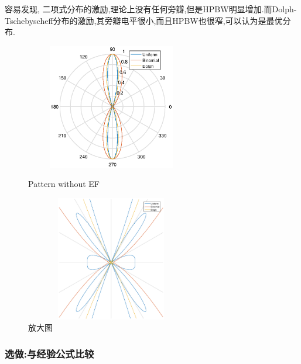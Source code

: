 容易发现, 二项式分布的激励,理论上没有任何旁瓣,但是HPBW明显增加.而Dolph-Tschebyscheff分布的激励,其旁瓣电平很小,而且HPBW也很窄,可以认为是最优分布. 
\begin{figure}[!ht]
	\begin{minipage}[t]{0.35\linewidth}
		\centering
		\includegraphics[height=5.5cm,width=7.5cm]{TenEle_without_EF.eps}
		\caption{Pattern without EF}\label{fig:10elenoEF}
	\end{minipage}%
	\hfill
	\begin{minipage}[t]{0.5\linewidth}
		\centering
		\includegraphics[height=5.5cm,width=7.5cm]{TenEle_without_EF_fangda.eps}
		\caption{放大图}\label{fig:10elenoEF_fangda}
		
	\end{minipage}
\end{figure}


\subsubsection{选做:与经验公式比较}


